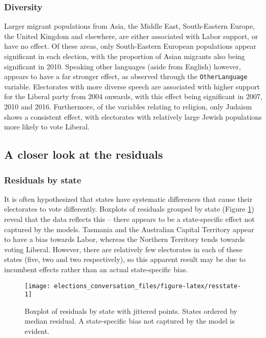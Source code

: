 \documentclass[11pt,a4paper,]{article}
\begin{document}
\hypertarget{diversity}{%
\subsubsection{Diversity}\label{diversity}}

Larger migrant populations from Asia, the Middle East, South-Eastern Europe, the United Kingdom and elsewhere, are either associated with Labor support, or have no effect. Of these areas, only South-Eastern European populations appear significant in each election, with the proportion of Asian migrants also being significant in 2010. Speaking other languages (aside from English) however, appears to have a far stronger effect, as observed through the \texttt{OtherLanguage} variable. Electorates with more diverse speech are associated with higher support for the Liberal party from 2004 onwards, with this effect being significant in 2007, 2010 and 2016. Furthermore, of the variables relating to religion, only Judaism shows a consistent effect, with electorates with relatively large Jewish populations more likely to vote Liberal.

\hypertarget{a-closer-look-at-the-residuals}{%
\subsection{A closer look at the residuals}\label{a-closer-look-at-the-residuals}}

\hypertarget{residuals-by-state}{%
\subsubsection{Residuals by state}\label{residuals-by-state}}

It is often hypothesized that states have systematic differences that cause their electorates to vote differently. Boxplots of residuals grouped by state (Figure \ref{fig:resstate}) reveal that the data reflects this -- there appears to be a state-specific effect not captured by the models. Tasmania and the Australian Capital Territory appear to have a bias towards Labor, whereas the Northern Territory tends towards voting Liberal. However, there are relatively few electorates in each of these states (five, two and two respectively), so this apparent result may be due to incumbent effects rather than an actual state-specific bias.

\begin{figure}[h]

{\centering \texttt{[image: elections\_conversation\_files/figure-latex/resstate-1]} 

}

\caption{Boxplot of residuals by state with jittered points. States ordered by median residual. A state-specific bias not captured by the model is evident.}\label{fig:resstate}
\end{figure}
\end{document}
